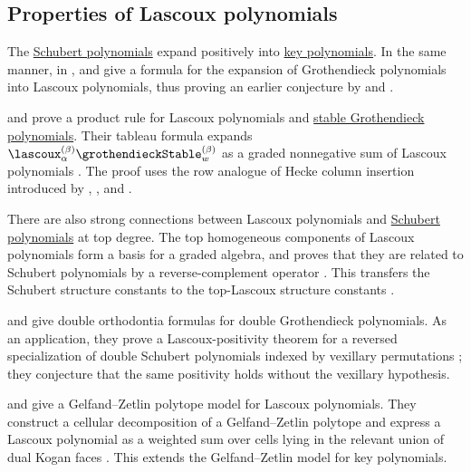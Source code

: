 \subsection[lascouxProperties]{Properties of Lascoux polynomials}


The \hyperref[schubert]{Schubert polynomials} expand positively into
\hyperref[key]{key polynomials}.
In the same manner, in \cite[Thm.~1.9]{ShimozonoYu2021},
 and  give a formula
for the expansion of Grothendieck polynomials into Lascoux polynomials,
thus proving an earlier conjecture by  and
 \cite{ReinerYong2021}.

 and  prove a product rule for
Lascoux polynomials and \hyperref[grothendieckStable]{stable Grothendieck
polynomials}.  Their tableau formula expands
$\lascoux_{\alpha}^{(\beta)} \grothendieckStable_w^{(\beta)}$
as a graded nonnegative sum of Lascoux polynomials
\cite[Thm.~1.3]{OrelowitzYu2023x}.  The proof uses the row analogue of
Hecke column insertion introduced by ,
, and 
\cite{HuangShimozonoYu2024}.

There are also strong connections between Lascoux polynomials and
\hyperref[schubert]{Schubert polynomials} at top degree.  The top
homogeneous components of Lascoux polynomials form a basis for a graded
algebra, and  proves that they are related to Schubert
polynomials by a reverse-complement operator \cite[Thm.~3.6 and
Cor.~3.8]{Yu2025}.  This transfers the Schubert structure constants to
the top-Lascoux structure constants \cite[Thm.~4.2]{Yu2025}.

 and  give double
orthodontia formulas for double Grothendieck polynomials.  As an
application, they prove a Lascoux-positivity theorem for a reversed
specialization of double Schubert polynomials indexed by vexillary
permutations \cite[Cor.~1.3]{SetiabrataDizier2024x}; they conjecture
that the same positivity holds without the vexillary hypothesis.

 and  give a
Gelfand--Zetlin polytope model for Lascoux polynomials.  They construct
a cellular decomposition of a Gelfand--Zetlin polytope and express a
Lascoux polynomial as a weighted sum over cells lying in the relevant
union of dual Kogan faces \cite[Thms.~4.3.1--4.3.3]{PresnovaSmirnov2024}.
This extends the Gelfand--Zetlin model for key polynomials.

